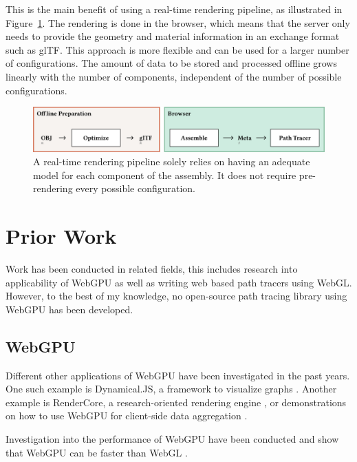 This is the main benefit of using a real-time rendering pipeline, as illustrated in Figure~\ref{fig:cad-online}. The rendering is done in the browser, which means that the server only needs to provide the geometry and material information in an exchange format such as glTF. This approach is more flexible and can be used for a larger number of configurations. The amount of data to be stored and processed offline grows linearly with the number of components, independent of the number of possible configurations.

\begin{figure}[H]
  \includegraphics[width=\columnwidth]{resources/cad-pipeline-online.png}
  \caption{A real-time rendering pipeline solely relies on having an adequate model for each component of the assembly. It does not require pre-rendering every possible configuration.}
  \label{fig:cad-online}
\end{figure}

\section{Prior Work}

Work has been conducted in related fields, this includes research into applicability of WebGPU as well as writing web based path tracers using WebGL. However, to the best of my knowledge, no open-source path tracing library using WebGPU has been developed.

\subsection{WebGPU}

Different other applications of WebGPU have been investigated in the past years. One such example is Dynamical.JS, a framework to visualize graphs \cite{dotson2022dynamicaljs}. Another example is RenderCore, a research-oriented rendering engine \cite{Bohak_Kovalskyi_Linev_Mrak_Tadel_Strban_Tadel_Yagil_2024}, or demonstrations on how to use WebGPU for client-side data aggregation \cite{kimmersdorfer2023webgpu}.

Investigation into the performance of WebGPU have been conducted and show that WebGPU can be faster than WebGL \cite{webGPUWebGis, fransson2023performance, CHICKERUR2024919}.
 

